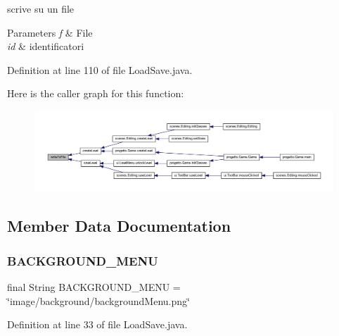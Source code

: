 scrive su un file 


\begin{DoxyParams}{Parameters}
{\em f} & File \\
\hline
{\em id} & identificatori \\
\hline
\end{DoxyParams}


Definition at line 110 of file Load\+Save.\+java.

Here is the caller graph for this function\+:\nopagebreak
\begin{figure}[H]
\begin{center}
\leavevmode
\includegraphics[width=350pt]{classhelpz_1_1_load_save_a953963a355bc62c6a3c1fdb51851d796_icgraph}
\end{center}
\end{figure}


\subsection{Member Data Documentation}
\mbox{\label{classhelpz_1_1_load_save_aa3d77f674caa25e1212a9469f7f3f86e}} 
\subsubsection{\texorpdfstring{B\+A\+C\+K\+G\+R\+O\+U\+N\+D\+\_\+\+M\+E\+NU}{BACKGROUND\_MENU}}
{\footnotesize\ttfamily final String B\+A\+C\+K\+G\+R\+O\+U\+N\+D\+\_\+\+M\+E\+NU = \char`\"{}image/background/background\+Menu.\+png\char`\"{}\hspace{0.3cm}{\ttfamily [static]}}



Definition at line 33 of file Load\+Save.\+java.

\mbox{\label{classhelpz_1_1_load_save_aa62695e0c0c7e0a290f0b290c526acd0}} 
